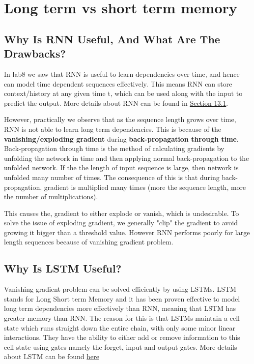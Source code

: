 \chapter{Long term vs short term memory}

\section{Why Is RNN Useful, And What Are The Drawbacks?}

In lab8 we saw that RNN is useful to learn dependencies over time, and hence can model time dependent sequences effectively.
This means RNN can store context/history at any given time t, which can be used along with the input to predict the output. 
More details about RNN can be found in \hyperref[sec:SimpleRecNet]{Section 13.1}.


However, practically we observe that as the sequence length grows over time, RNN is not able to learn long term dependencies.
This is because of the \textbf{vanishing/exploding gradient} during \textbf{back-propagation through time}.
Back-propagation through time is the method of calculating gradients by unfolding the network in time and then applying normal back-propagation to the unfolded network.
If the the length of input sequence is large, then network is unfolded many number of times.
The consequence of this is that during back-propagation, gradient is multiplied many times (more the sequence length, more the number of multiplications). 


This causes the, gradient to either explode or vanish, which is undesirable.
To solve the issue of exploding gradient, we generally "clip" the gradient to avoid growing it bigger than a threshold value.
However RNN performs poorly for large length sequences because of vanishing gradient problem.

\section{Why Is LSTM Useful?}
Vanishing gradient problem can be solved efficiently by using LSTMs.
LSTM stands for Long Short term Memory and it has been proven effective to model long term dependencies more effectively than RNN, meaning that LSTM has greater memory than RNN.
The reason for this is that LSTMs maintain a cell state which runs straight down the entire chain, with only some minor linear interactions.
They have the ability to either add or remove information to this cell state using gates namely the forget, input  and output gates.
More details about LSTM can be found \hyperref[sec:long-short-term-memory]{here}


